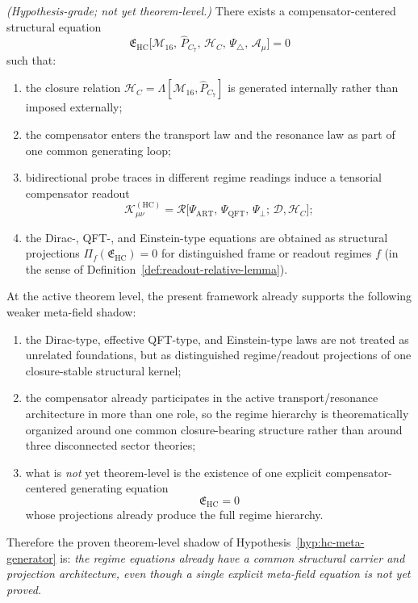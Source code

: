 \begin{proposition}
\label{hyp:hc-meta-generator}
\emph{(Hypothesis-grade; not yet theorem-level.)}
There exists a compensator-centered structural equation
\[
 \mathfrak{E}_{\mathrm{HC}}
 \bigl[
 \mathcal{M}_{16},\,
 \hat{P}_{C_7},\,
 \mathcal{H}_C,\,
 \Psi_\triangle,\,
 \mathcal{A}_\mu
 \bigr]
 = 0
\]
such that:
\begin{enumerate}[label=(\roman*)]
 \item the closure relation
 $\mathcal{H}_C = \Lambda[\mathcal{M}_{16},\hat{P}_{C_7}]$
 is generated internally rather than imposed externally;
 \item the compensator enters the transport law and the resonance law
 as part of one common generating loop;
 \item bidirectional probe traces in different regime readings induce a
 tensorial compensator readout
 \[
 \mathcal{K}_{\mu\nu}^{(\mathrm{HC})}
 =
 \mathcal{R}\bigl[
 \Psi_{\mathrm{ART}},\,
 \Psi_{\mathrm{QFT}},\,
 \Psi_\perp;\,
 \mathcal{D},\mathcal{H}_C
 \bigr];
 \]
 \item the Dirac-, QFT-, and Einstein-type equations are obtained as
 structural projections
 $\Pi_f(\mathfrak{E}_{\mathrm{HC}}) = 0$
 for distinguished frame or readout regimes $f$
 (in the sense of Definition~\ref{def:readout-relative-lemma}).
\end{enumerate}
\end{proposition}

\begin{theorem}
\label{thm:theorem-level-shadow-hc-meta-field-generator}
At the active theorem level, the present framework already supports the following weaker meta-field shadow:
\begin{enumerate}[leftmargin=2em,label=(\roman*)]
 \item the Dirac-type, effective QFT-type, and Einstein-type laws are not treated as unrelated foundations, but as distinguished regime/readout projections of one closure-stable structural kernel;
 \item the compensator already participates in the active transport/resonance architecture in more than one role, so the regime hierarchy is theorematically organized around one common closure-bearing structure rather than around three disconnected sector theories;
 \item what is \emph{not} yet theorem-level is the existence of one explicit compensator-centered generating equation
 \[
 \mathfrak E_{\mathrm{HC}}=0
 \]
 whose projections already produce the full regime hierarchy.
\end{enumerate}
Therefore the proven theorem-level shadow of Hypothesis~\ref{hyp:hc-meta-generator} is:
\emph{the regime equations already have a common structural carrier and projection architecture, even though a single explicit meta-field equation is not yet proved.}
\end{theorem}

